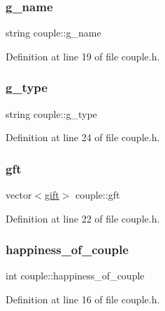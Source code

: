 \subsubsection{\texorpdfstring{g\+\_\+name}{g\_name}}
{\footnotesize\ttfamily string couple\+::g\+\_\+name}



Definition at line 19 of file couple.\+h.

\mbox{\label{classcouple_a591de2e782415686dd757b0b6a9f5058}} 
\subsubsection{\texorpdfstring{g\+\_\+type}{g\_type}}
{\footnotesize\ttfamily string couple\+::g\+\_\+type}



Definition at line 24 of file couple.\+h.

\mbox{\label{classcouple_ad96c4fee691c9554eef4d04b7c0256eb}} 
\subsubsection{\texorpdfstring{gft}{gft}}
{\footnotesize\ttfamily vector$<$\hyperlink{classgift}{gift}$>$ couple\+::gft}



Definition at line 22 of file couple.\+h.

\mbox{\label{classcouple_a6f5f14c94d6a5a49714a5fff65f64cbf}} 
\subsubsection{\texorpdfstring{happiness\+\_\+of\+\_\+couple}{happiness\_of\_couple}}
{\footnotesize\ttfamily int couple\+::happiness\+\_\+of\+\_\+couple}



Definition at line 16 of file couple.\+h.

\mbox{\label{classcouple_acccc6fc5885997464ab7716eafa90331}} 
